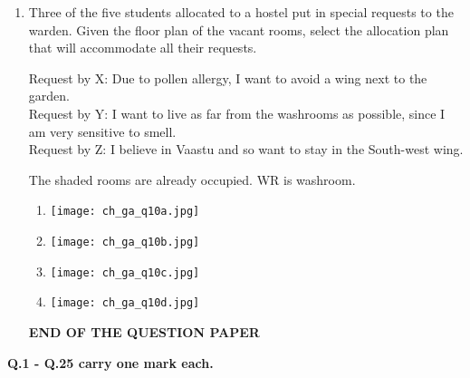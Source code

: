 \documentclass[12pt]{article}
\begin{document}
\begin{enumerate}[label=\textbf{Q.\arabic*}., start=6, leftmargin=*]
	\item Three of the five students allocated to a hostel put in special requests to the warden. Given the floor plan of the vacant rooms, select the allocation plan that will accommodate all their requests.

		Request by X: Due to pollen allergy, I want to avoid a wing next to the garden.\\
		Request by Y: I want to live as far from the washrooms as possible, since I am very sensitive to smell.\\
		Request by Z: I believe in Vaastu and so want to stay in the South-west wing.

		The shaded rooms are already occupied. WR is washroom.

		\begin{multicols}{2}
			\begin{enumerate}[label=(\Alph*)]
				\item \texttt{[image: ch\_ga\_q10a.jpg]}
				\item \texttt{[image: ch\_ga\_q10b.jpg]}
				\item \texttt{[image: ch\_ga\_q10c.jpg]}
				\item \texttt{[image: ch\_ga\_q10d.jpg]}
			\end{enumerate}
		\end{multicols}
		\vspace{\baselineskip}
		\begin{center}
			{\textbf{END OF THE QUESTION PAPER}}
		\end{center}
		\newpage
\end{enumerate}
\setcounter{page}{1}
\noindent\textbf{Q.1 - Q.25 carry one mark each.}
\end{document}
